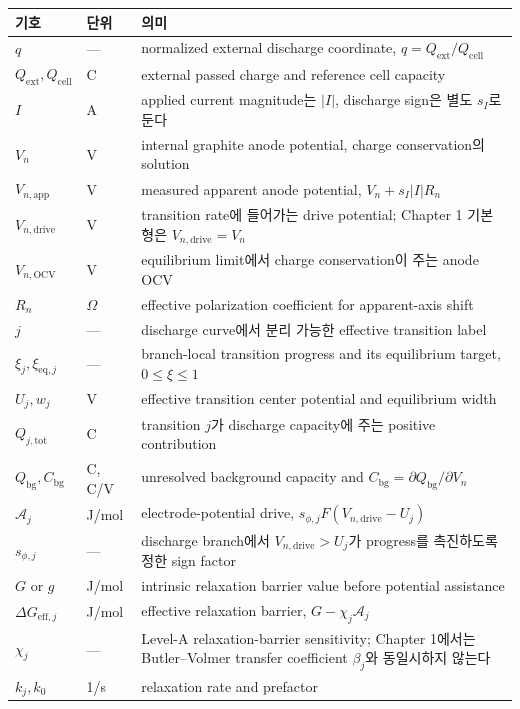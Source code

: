 \documentclass[11pt,a4paper]{article}
\newcommand{\eff}{\mathrm{eff}}
\newcommand{\eq}{\mathrm{eq}}
\newcommand{\app}{\mathrm{app}}
\newcommand{\drive}{\mathrm{drive}}
\newcommand{\bg}{\mathrm{bg}}
\newcommand{\cell}{\mathrm{cell}}
\newcommand{\ext}{\mathrm{ext}}
\newcommand{\OCV}{\mathrm{OCV}}
\newcommand{\tot}{\mathrm{tot}}
\begin{document}
\begin{longtable}{p{} p{} p{}}
\toprule 기호 & 단위 & 의미 \\ \midrule \endhead
$q$ & --- & normalized external discharge coordinate, $q=Q_{\ext}/Q_{\cell}$ \\
$Q_{\ext},Q_{\cell}$ & C & external passed charge and reference cell capacity \\
$I$ & A & applied current magnitude는 $|I|$, discharge sign은 별도 $s_I$로 둔다 \\
$V_n$ & V & internal graphite anode potential, charge conservation의 solution \\
$V_{n,\app}$ & V & measured apparent anode potential, $V_n+s_I|I|R_n$ \\
$V_{n,\drive}$ & V & transition rate에 들어가는 drive potential; Chapter 1 기본형은 $V_{n,\drive}=V_n$ \\
$V_{n,\OCV}$ & V & equilibrium limit에서 charge conservation이 주는 anode OCV \\
$R_n$ & $\Omega$ & effective polarization coefficient for apparent-axis shift \\
$j$ & --- & discharge curve에서 분리 가능한 effective transition label \\
$\xi_j,\xi_{\eq,j}$ & --- & branch-local transition progress and its equilibrium target, $0\le\xi\le1$ \\
$U_j,w_j$ & V & effective transition center potential and equilibrium width \\
$Q_{j,\tot}$ & C & transition $j$가 discharge capacity에 주는 positive contribution \\
$Q_{\bg},C_{\bg}$ & C, C/V & unresolved background capacity and $C_{\bg}=\partial Q_{\bg}/\partial V_n$ \\
$\mathcal A_j$ & J/mol & electrode-potential drive, $s_{\phi,j}F(V_{n,\drive}-U_j)$ \\
$s_{\phi,j}$ & --- & discharge branch에서 $V_{n,\drive}>U_j$가 progress를 촉진하도록 정한 sign factor \\
$G$ or $g$ & J/mol & intrinsic relaxation barrier value before potential assistance \\
$\Delta G_{\eff,j}$ & J/mol & effective relaxation barrier, $G-\chi_j\mathcal A_j$ \\
$\chi_j$ & --- & Level-A relaxation-barrier sensitivity; Chapter 1에서는 Butler--Volmer transfer coefficient $\beta_j$와 동일시하지 않는다 \\
$k_j,k_0$ & 1/s & relaxation rate and prefactor \\

\end{longtable}
\end{document}
